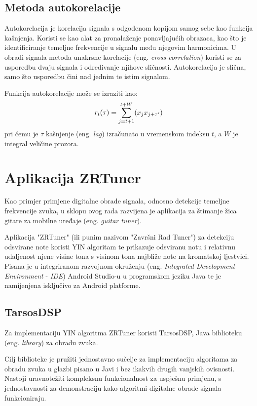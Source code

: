 \documentclass[times, utf8, zavrsni, numeric]{fer}
\begin{document}
\section{Metoda autokorelacije}
Autokorelacija je korelacija signala s odgođenom kopijom samog sebe kao funkcija kašnjenja.\cite{de2002yin} Koristi se kao alat za pronalaženje ponavljajućih obrazaca, kao što je identificiranje temeljne frekvencije u signalu među njegovim harmonicima. U obradi signala metoda unakrsne korelacije (eng. \textit{cross-correlation}) koristi se za usporedbu dvaju signala i određivanje njihove sličnosti. Autokorelacija je slična, samo što usporedbu čini nad jednim te istim signalom.

Funkcija autokorelacije može se izraziti kao:
\begin{equation}
	r_t(\tau) = \sum_{j=t+1}^{t+W} (x_jx_{j+\tau'})\\
\end{equation}
pri čemu je $\tau$ kašnjenje (eng. \textit{lag}) izračunato u vremenskom indeksu $t$, a $W$ je integral veličine prozora.\cite{de2002yin}

%

\chapter{Aplikacija ZRTuner}
Kao primjer primjene digitalne obrade signala, odnosno detekcije temeljne frekvencije zvuka, u sklopu ovog rada razvijena je aplikacija za štimanje žica gitare za mobilne uređaje (eng. \textit{guitar tuner}).

Aplikacija "ZRTuner" (ili punim nazivom "Završni Rad Tuner") za detekciju odsvirane note koristi YIN algoritam te prikazuje odsviranu notu i relativnu udaljenost njene visine tona s visinom tona najbliže note na kromatskoj ljestvici. Pisana je u integriranom razvojnom okruženju (eng. \textit{Integrated Development Environment} - \textit{IDE}) Android Studio-u u programskom jeziku Java te je namijenjena isključivo za Android platforme.

\section{TarsosDSP}
Za implementaciju YIN algoritma ZRTuner koristi TarsosDSP, Java biblioteku (eng. \textit{library}) za obradu zvuka.\cite{six2014tarsosdsp}

Cilj biblioteke je pružiti jednostavno sučelje za implementaciju algoritama za obradu zvuka u glazbi pisano u Javi i bez ikakvih drugih vanjskih ovisnosti. Nastoji uravnotežiti kompleksnu funkcionalnost za uspješnu primjenu, s jednostavnosti za demonstraciju kako algoritmi digitalne obrade signala funkcioniraju.\cite{six_cornelis_lerman}
\end{document}

